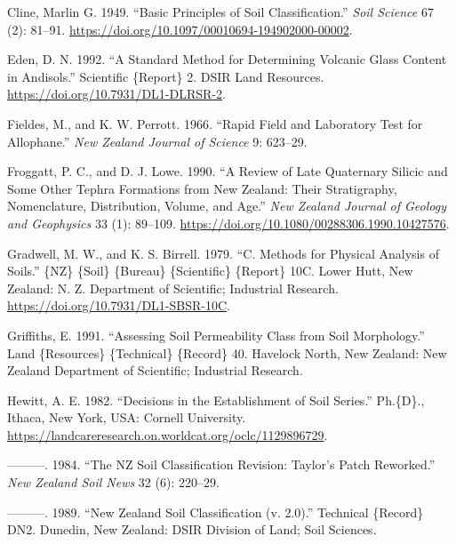\documentclass[
  letterpaper,
  DIV=11,
  numbers=noendperiod]{scrreprt}
\newlength{\cslhangindent}
\newlength{\cslentryspacingunit} %
\newenvironment{CSLReferences}[2] %
 {%
  \setlength{\parindent}{0pt}
  \ifodd #1
  \let\oldpar\par
  \def\par{\hangindent=\cslhangindent\oldpar}
  \fi
  \setlength{\parskip}{#2\cslentryspacingunit}
 }%
 {}
\begin{document}
\begin{CSLReferences}{1}{0}
\leavevmode{}%
Cline, Marlin G. 1949. {``Basic {Principles} of {Soil}
{Classification}.''} \emph{Soil Science} 67 (2): 81--91.
\url{https://doi.org/10.1097/00010694-194902000-00002}.

\leavevmode{}%
Eden, D. N. 1992. {``A Standard Method for Determining Volcanic Glass
Content in {Andisols}.''} Scientific \{Report\} 2. DSIR Land Resources.
\url{https://doi.org/10.7931/DL1-DLRSR-2}.

\leavevmode{}%
Fieldes, M., and K. W. Perrott. 1966. {``Rapid Field and Laboratory Test
for Allophane.''} \emph{New Zealand Journal of Science} 9: 623--29.

\leavevmode{}%
Froggatt, P. C., and D. J. Lowe. 1990. {``A Review of Late {Quaternary}
Silicic and Some Other Tephra Formations from {New} {Zealand}: {Their}
Stratigraphy, Nomenclature, Distribution, Volume, and Age.''} \emph{New
Zealand Journal of Geology and Geophysics} 33 (1): 89--109.
\url{https://doi.org/10.1080/00288306.1990.10427576}.

\leavevmode{}%
Gradwell, M. W., and K. S. Birrell. 1979. {``C. {Methods} for Physical
Analysis of Soils.''} \{NZ\} \{Soil\} \{Bureau\} \{Scientific\}
\{Report\} 10C. Lower Hutt, New Zealand: N. Z. Department of Scientific;
Industrial Research. \url{https://doi.org/10.7931/DL1-SBSR-10C}.

\leavevmode{}%
Griffiths, E. 1991. {``Assessing Soil Permeability Class from Soil
Morphology.''} Land \{Resources\} \{Technical\} \{Record\} 40. Havelock
North, New Zealand: New Zealand Department of Scientific; Industrial
Research.

\leavevmode{}%
Hewitt, A. E. 1982. {``Decisions in the {Establishment} of {Soil}
{Series}.''} Ph.\{D\}., Ithaca, New York, USA: Cornell University.
\url{https://landcareresearch.on.worldcat.org/oclc/1129896729}.

\leavevmode{}%
---------. 1984. {``The {NZ} {Soil} {Classification} {Revision}:
{Taylor}'s {Patch} {Reworked}.''} \emph{New Zealand Soil News} 32 (6):
220--29.

\leavevmode{}%
---------. 1989. {``New {Zealand} {Soil} {Classification} (v. 2.0).''}
Technical \{Record\} DN2. Dunedin, New Zealand: DSIR Division of Land;
Soil Sciences.


\end{CSLReferences}
\end{document}
